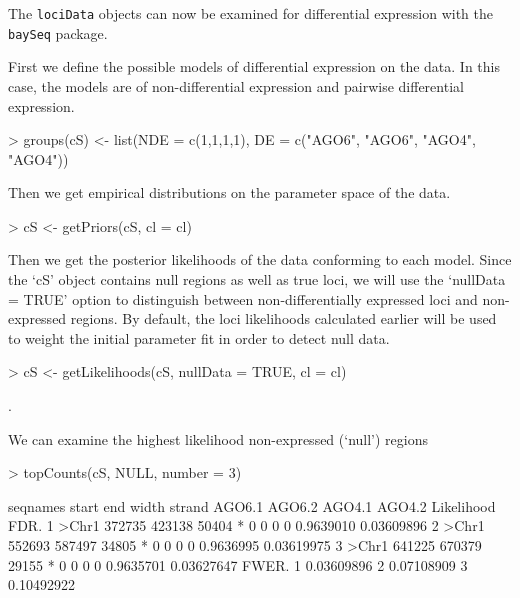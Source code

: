 \documentclass[a4paper]{article}
\begin{document}
The \verb'lociData' objects can now be examined for differential expression with the \verb'baySeq' package.

First we define the possible models of differential expression on the data. In this case, the models are of non-differential expression and pairwise differential expression.
\begin{Schunk}
\begin{Sinput}
> groups(cS) <- list(NDE = c(1,1,1,1), DE = c("AGO6", "AGO6", "AGO4", "AGO4"))
\end{Sinput}
\end{Schunk}

Then we get empirical distributions on the parameter space of the data.
\begin{Schunk}
\begin{Sinput}
> cS <- getPriors(cS, cl = cl)
\end{Sinput}
\end{Schunk}

Then we get the posterior likelihoods of the data conforming to each model. Since the `cS' object contains null regions as well as true loci, we will use the `nullData = TRUE' option to distinguish between non-differentially expressed loci and non-expressed regions. By default, the loci likelihoods calculated earlier will be used to weight the initial parameter fit in order to detect null data.
\begin{Schunk}
\begin{Sinput}
> cS <- getLikelihoods(cS, nullData = TRUE, cl = cl)
\end{Sinput}
\begin{Soutput}
.
\end{Soutput}
\end{Schunk}

We can examine the highest likelihood non-expressed (`null') regions

\begin{Schunk}
\begin{Sinput}
> topCounts(cS, NULL, number = 3)
\end{Sinput}
\begin{Soutput}
  seqnames  start    end width strand AGO6.1 AGO6.2 AGO4.1 AGO4.2 Likelihood       FDR.
1    >Chr1 372735 423138 50404      *      0      0      0      0  0.9639010 0.03609896
2    >Chr1 552693 587497 34805      *      0      0      0      0  0.9636995 0.03619975
3    >Chr1 641225 670379 29155      *      0      0      0      0  0.9635701 0.03627647
       FWER.
1 0.03609896
2 0.07108909
3 0.10492922
\end{Soutput}
\end{Schunk}
\end{document}
